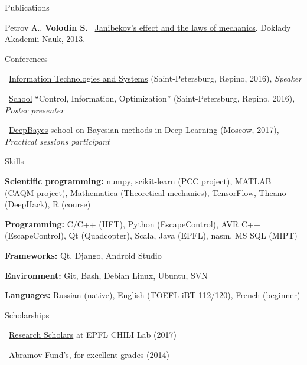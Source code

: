 \documentclass{resume} %
\begin{document}
\begin{rSection}{Publications}
\item Petrov A., {\bf Volodin S.} \faExternalLink~\href{https://link.springer.com/article/10.1134/S1028335813080041}{Janibekov’s effect and the laws of mechanics}. Doklady Akademii Nauk, 2013.
\end{rSection}
\newpage
\begin{rSection}{Conferences}
\item \faExternalLink~\href{http://iitp.ru/en/conferences/itas}{Information Technologies and Systems} (Saint-Petersburg, Repino, 2016){, \em Speaker}
\item \faExternalLink~\href{https://sites.google.com/site/traditionalschool/about}{School} ``Control, Information, Optimization'' (Saint-Petersburg, Repino, 2016){, \em Poster presenter}
\item \faExternalLink~\href{http://deepbayes.ru}{DeepBayes} school on Bayesian methods in Deep Learning (Moscow, 2017){, \em Practical sessions participant}
\end{rSection}

\begin{rSection}{Skills}
	\item {\bf Scientific programming:} numpy, scikit-learn (PCC project), MATLAB (CAQM project), Mathematica (Theoretical mechanics), TensorFlow, Theano (DeepHack), R (course)
	\item {\bf Programming:} C/C++ (HFT), Python (EscapeControl), AVR C++ (EscapeControl), Qt (Quadcopter), Scala, Java (EPFL), nasm, MS SQL (MIPT)
	\item {\bf Frameworks:} Qt, Django, Android Studio
	\item {\bf Environment:} Git, Bash, Debian Linux, Ubuntu, SVN
	\item {\bf Languages:} Russian (native), English (TOEFL iBT 112/120), French (beginner)
\end{rSection}

\begin{rSection}{Scholarships}
\item \faExternalLink~\href{https://ic.epfl.ch/ResearchScholars}{Research Scholars} at EPFL CHILI Lab (2017)
\item \faExternalLink~\href{http://phystech-foundation.org/}{Abramov Fund's}, for excellent grades (2014)
\end{rSection}
\end{document}
